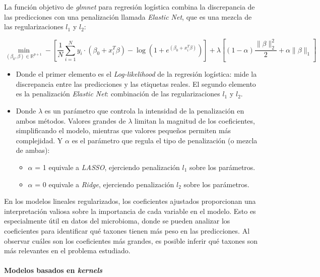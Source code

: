 La función objetivo de \textit{glmnet} para regresión logística combina la discrepancia de las predicciones con una penalización llamada \textit{Elastic Net}, que es una mezcla de las regularizaciones $l_1$ y  $l_2$:

\begin{equation}
\min_{(\beta_0, \beta) \in \mathbb{R}^{p+1}} - \left[ \frac{1}{N} \sum_{i=1}^{N} y_i \cdot (\beta_0 + x_i^T \beta) - \log(1 + e^{(\beta_0 + x_i^T \beta)}) \right] + \lambda \left[ (1 - \alpha) \frac{\|\beta\|_2^2}{2} + \alpha \|\beta\|_1 \right]
\end{equation}
\begin{itemize}
\item Donde el primer elemento es el \textit{Log-likelihood} de la regresión logística: mide la discrepancia entre las predicciones y las etiquetas reales. El segundo elemento es la penalización \textit{Elastic Net}: combinación de las regularizaciones $l_1$ y $l_2$.

\item Donde $\lambda$ es un parámetro que controla la intensidad de la penalización en ambos métodos. Valores grandes de $\lambda$ limitan la magnitud de los coeficientes, simplificando el modelo, mientras que valores pequeños permiten más complejidad. Y $\alpha$ es el parámetro que regula el tipo de penalización (o mezcla de ambas):
\begin{itemize}
\item $\alpha$ = 1 equivale a \textit{LASSO}, ejerciendo penalización $l_1$ sobre los parámetros.
\item $\alpha$ = 0 equivale a \textit{Ridge}, ejerciendo penalización $l_2$ sobre los parámetros.
\end{itemize}
\end{itemize}

En los modelos lineales regularizados, los coeficientes ajustados proporcionan una interpretación valiosa sobre la importancia de cada variable en el modelo. Esto es especialmente útil en datos del microbioma, donde se pueden analizar los coeficientes para identificar qué taxones tienen más peso en las predicciones. Al observar cuáles son los coeficientes más grandes, es posible inferir qué taxones son más relevantes en el problema estudiado.

\paragraph{Modelos basados en \textit{kernels}}

